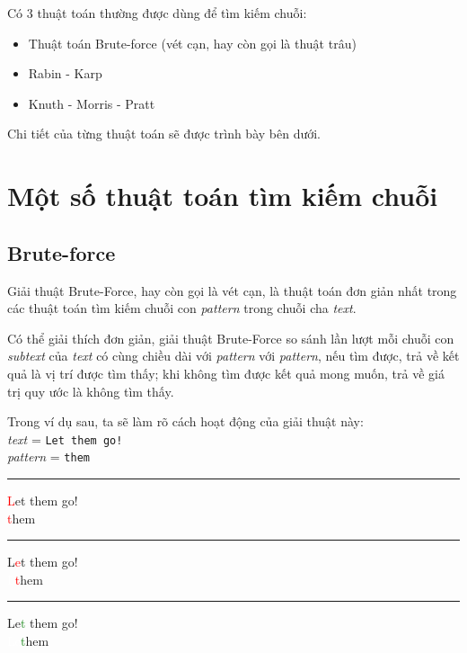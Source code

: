\documentclass[a4paper,11pt]{article}
\begin{document}
	\vspace*{3mm}
	Có 3 thuật toán thường được dùng để tìm kiếm chuỗi:
	\begin{itemize}
	    \item Thuật toán Brute-force (vét cạn, hay còn gọi là thuật trâu)
	    \item Rabin - Karp
	    \item Knuth - Morris - Pratt
	\end{itemize}
	Chi tiết của từng thuật toán sẽ được trình bày bên dưới.

	\section{Một số thuật toán tìm kiếm chuỗi}

		\subsection {Brute-force} 
		
			Giải thuật Brute-Force, hay còn gọi là vét cạn, 
			là thuật toán đơn giản nhất trong các thuật toán 
			tìm kiếm chuỗi con \textit{pattern} 
			trong chuỗi cha \textit{text}.

			Có thể giải thích đơn giản, giải thuật Brute-Force 
			so sánh lần lượt mỗi chuỗi con \textit{subtext} của \textit{text} 
			có cùng chiều dài với \textit{pattern} với \textit{pattern}, 
			nếu tìm được, trả về kết quả là vị trí được tìm thấy; khi không 
			tìm được kết quả mong muốn, trả về giá trị quy ước là không tìm thấy.

			Trong ví dụ sau, ta sẽ làm rõ cách hoạt động của giải thuật này:\\
			\textit{text} \hspace*{7mm}= \verb|Let them go!| \\
			\textit{pattern} \hspace*{0.1mm} = \verb|them| 
			\vspace*{4mm}
			\hrule
			\textcolor{red}{L}et them go!\\
			\textcolor{red}{t}hem

			\vspace*{2mm}
			\hrule
			L\textcolor{red}{e}t them go!\\
			\textcolor{white}{L}\textcolor{red}{t}hem
			
			\vspace*{2mm}
			\hrule
			Le\textcolor{ForestGreen}{t} them go!\\
			\textcolor{white}{Le}\textcolor{ForestGreen}{t}hem
			
\end{document}
